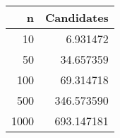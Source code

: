 \begin{table}
\label{tab:exp_candidates}
\begin{tabular}{rr}
\toprule
n & Candidates \\
\midrule
10 & 6.931472 \\
50 & 34.657359 \\
100 & 69.314718 \\
500 & 346.573590 \\
1000 & 693.147181 \\
\bottomrule
\end{tabular}
\end{table}

